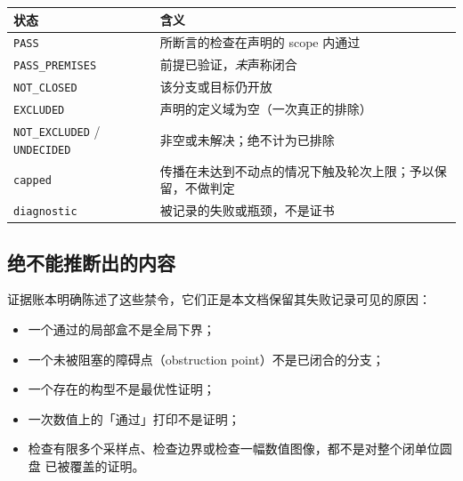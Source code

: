 \begin{center}
\footnotesize
\begin{tabular}{@{}>{\raggedright\arraybackslash}p{}>{\raggedright\arraybackslash}p{}@{}}
\toprule
状态 & 含义 \\
\midrule
\texttt{PASS} & 所断言的检查在声明的 scope 内通过 \\
\texttt{PASS\_\allowbreak{}PREMISES} & 前提已验证，\emph{未}声称闭合 \\
\texttt{NOT\_\allowbreak{}CLOSED} & 该分支或目标仍开放 \\
\texttt{EXCLUDED} & 声明的定义域为空（一次真正的排除） \\
\texttt{NOT\_\allowbreak{}EXCLUDED} / \texttt{UNDECIDED} & 非空或未解决；绝不计为已排除 \\
\texttt{capped} & 传播在未达到不动点的情况下触及轮次上限；予以保留，不做判定 \\
\texttt{diagnostic} & 被记录的失败或瓶颈，不是证书 \\
\bottomrule
\end{tabular}
\end{center}

\subsection{绝不能推断出的内容}

证据账本明确陈述了这些禁令，它们正是本文档保留其失败记录可见的原因：
\begin{itemize}[leftmargin=1.4em,itemsep=2pt]
\item 一个通过的局部盒不是全局下界；
\item 一个未被阻塞的障碍点（obstruction point）不是已闭合的分支；
\item 一个存在的构型不是最优性证明；
\item 一次数值上的「通过」打印不是证明；
\item 检查有限多个采样点、检查边界或检查一幅数值图像，都不是对整个闭单位圆盘
已被覆盖的证明。
\end{itemize}
